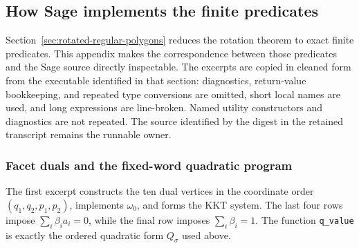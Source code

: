 \subsection{How Sage implements the finite predicates}
\label{subsec:rotated-pentagon-sage-source}

Section~\ref{sec:rotated-regular-polygons} reduces the rotation theorem to exact
finite predicates. This appendix makes the correspondence between those
predicates and the Sage source directly inspectable.  The excerpts are copied
in cleaned form from the executable identified in that section: diagnostics, return-value
bookkeeping, and repeated type conversions are omitted, short local names are
used, and long expressions are line-broken.  Named utility constructors and
diagnostics are not repeated.  The source identified by the digest in the
retained transcript remains the runnable owner.

\subsubsection*{Facet duals and the fixed-word quadratic program}
The first excerpt constructs the ten dual vertices in the coordinate order
\((q_1,q_2,p_1,p_2)\), implements \(\omega_0\), and forms the KKT system.
The last four rows impose
\(\sum_i\beta_i a_i=0\), while the final row imposes
\(\sum_i\beta_i=1\).  The function \texttt{q\_value} is exactly the ordered
quadratic form \(Q_\sigma\) used above.

